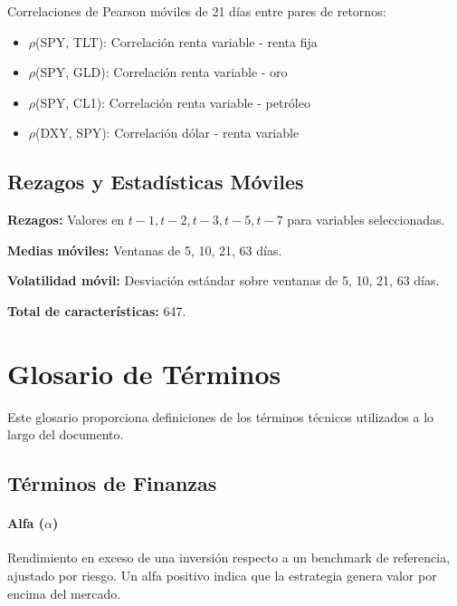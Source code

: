 \documentclass[11pt,a4paper]{article}
\begin{document}
Correlaciones de Pearson móviles de 21 días entre pares de retornos:
\begin{itemize}[noitemsep]
    \item $\rho$(SPY, TLT): Correlación renta variable - renta fija
    \item $\rho$(SPY, GLD): Correlación renta variable - oro
    \item $\rho$(SPY, CL1): Correlación renta variable - petróleo
    \item $\rho$(DXY, SPY): Correlación dólar - renta variable
\end{itemize}

\subsection{Rezagos y Estadísticas Móviles}

\textbf{Rezagos:} Valores en $t-1, t-2, t-3, t-5, t-7$ para variables seleccionadas.

\textbf{Medias móviles:} Ventanas de 5, 10, 21, 63 días.

\textbf{Volatilidad móvil:} Desviación estándar sobre ventanas de 5, 10, 21, 63 días.

\textbf{Total de características:} 647.





\section{Glosario de Términos}
\label{app:glossary}

Este glosario proporciona definiciones de los términos técnicos utilizados a lo largo del documento.

\subsection*{Términos de Finanzas}

\paragraph{Alfa ($\alpha$)} \label{glos:alfa}
Rendimiento en exceso de una inversión respecto a un benchmark de referencia, ajustado por riesgo. Un alfa positivo indica que la estrategia genera valor por encima del mercado.
\end{document}
